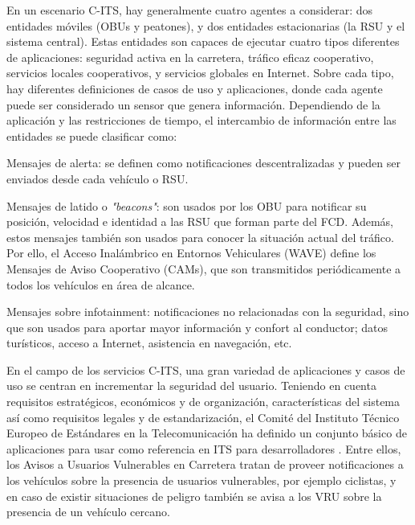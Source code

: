En un escenario C-ITS, hay generalmente cuatro agentes a considerar: dos entidades
móviles (OBUs y peatones), y dos entidades estacionarias (la RSU y el sistema central).
Estas entidades son capaces de ejecutar cuatro tipos diferentes de aplicaciones:
seguridad activa en la carretera, tráfico eficaz cooperativo, servicios locales
cooperativos, y servicios globales en Internet. Sobre cada tipo, hay diferentes
definiciones de casos de uso y aplicaciones, donde cada agente puede ser considerado
un sensor que genera información. Dependiendo de la aplicación y las restricciones de 
tiempo, el intercambio de información entre las entidades se puede clasificar como:
\begin{description}
	\item{Mensajes de alerta:} se definen como notificaciones descentralizadas 
	y pueden ser enviados desde cada vehículo o RSU.

	\item{Mensajes de latido o \emph{"beacons"}:} son usados por los OBU para
	notificar su posición, velocidad e identidad a las RSU que forman parte del
	FCD. Además, estos mensajes también son usados para conocer la situación
	actual del tráfico. Por ello, el Acceso Inalámbrico en Entornos Vehiculares (WAVE)
	define los Mensajes de Aviso Cooperativo (CAMs), que son transmitidos periódicamente
	a todos los vehículos en área de alcance.

	\item{Mensajes sobre infotainment}: notificaciones no relacionadas con la seguridad,
	sino que son usados para aportar mayor información y confort al conductor; datos
	turísticos, acceso a Internet, asistencia en navegación, etc.
\end{description}

En el campo de los servicios C-ITS, una gran variedad de aplicaciones y casos de uso
se centran en incrementar la seguridad del usuario. Teniendo en cuenta requisitos
estratégicos, económicos y de organización, características del sistema así como
requisitos legales y de estandarización, el Comité del Instituto Técnico Europeo de
Estándares en la Telecomunicación ha definido un conjunto básico de aplicaciones para
usar como referencia en ITS para desarrolladores \cite{6}. Entre ellos, los Avisos a Usuarios
Vulnerables en Carretera tratan de proveer notificaciones a los vehículos sobre la
presencia de usuarios vulnerables, por ejemplo ciclistas, y en caso de existir situaciones
de peligro también se avisa a los VRU sobre la presencia de un vehículo cercano.

